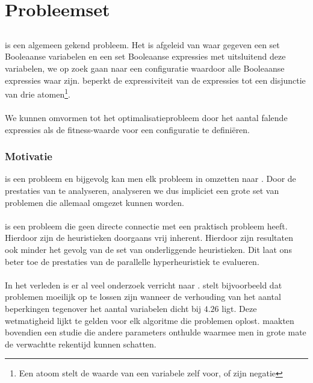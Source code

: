 \section{Probleemset}

\subsection{}

 is een algemeen gekend probleem. Het is afgeleid van  waar gegeven een set Booleaanse variabelen en een set Booleaanse expressies met uitsluitend deze variabelen, we op zoek gaan naar een configuratie waardoor alle Booleaanse expressies waar zijn.  beperkt de expressiviteit van de expressies tot een disjunctie van drie atomen\footnote{Een atoom stelt de waarde van een variabele zelf voor, of zijn negatie}.

\paragraph{}
We kunnen  omvormen tot het optimalisatieprobleem  door het aantal falende expressies als de fitness-waarde voor een configuratie te defini\"eren.

\subsubsection{Motivatie}

 is een  probleem en bijgevolg kan men elk probleem in  omzetten naar . Door de prestaties van  te analyseren, analyseren we dus impliciet een grote set van problemen die allemaal omgezet kunnen worden.

\paragraph{}
 is een probleem die geen directe connectie met een praktisch probleem heeft. Hierdoor zijn de heuristieken doorgaans vrij inherent. Hierdoor zijn resultaten ook minder het gevolg van de set van onderliggende heuristieken. Dit laat ons beter toe de prestaties van de parallelle hyperheuristiek te evalueren.

\paragraph{}
In het verleden is er al veel onderzoek verricht naar . \cite{Selman96generatinghard} stelt bijvoorbeeld dat  problemen moeilijk op te lossen zijn wanneer de verhouding van het aantal beperkingen tegenover het aantal variabelen dicht bij $4.26$ ligt. Deze wetmatigheid lijkt te gelden voor elk algoritme die  problemen oplost. \cite{Nudelman_understandingrandom} maakten bovendien een studie die andere parameters onthulde waarmee men in grote mate de verwachtte rekentijd kunnen schatten.

